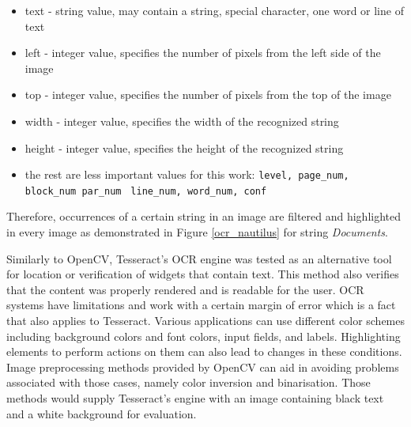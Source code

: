 \begin{itemize}
    \item text - string value, may contain a string, special character, one word or line of text
    \item left - integer value, specifies the number of pixels from the left side of the image 
    \item top - integer value, specifies the number of pixels from the top of the image
    \item width - integer value, specifies the width of the recognized string 
    \item height - integer value, specifies the height of the recognized string
    \item the rest are less important values for this work: \verb|level, page_num, block_num par_num|
    \verb| line_num, word_num, conf|
\end{itemize}

Therefore, occurrences of a certain string in an image are filtered and highlighted in every image as demonstrated in Figure \ref{ocr_nautilus} for string \textit{Documents}.

Similarly to OpenCV, Tesseract's OCR engine was tested as an alternative tool for location or verification of widgets that contain text. This method also verifies that the content was properly rendered and is readable for the user. OCR systems have limitations and work with a certain margin of error which is a fact that also applies to Tesseract. Various applications can use different color schemes including background colors and font colors, input fields, and labels. Highlighting elements to perform actions on them can also lead to changes in these conditions. Image preprocessing methods provided by OpenCV can aid in avoiding problems associated with those cases, namely color inversion and binarisation. Those methods would supply Tesseract's engine with an image containing black text and a white background for evaluation.

